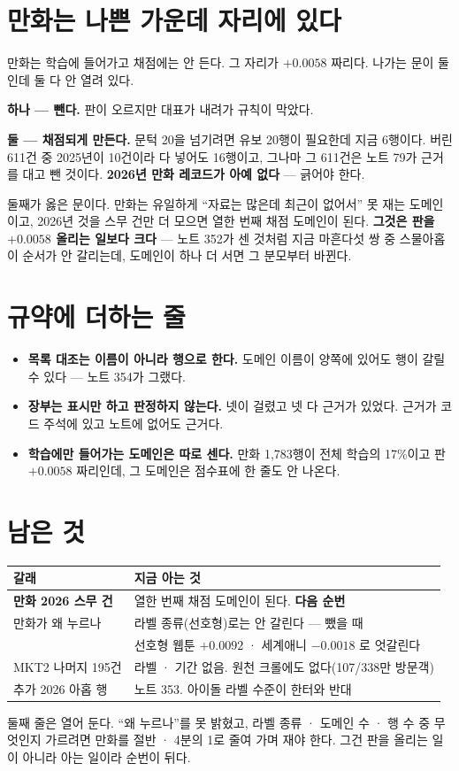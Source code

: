 \documentclass[11pt]{article}
\begin{document}
\section{만화는 나쁜 가운데 자리에 있다}

만화는 학습에 들어가고 채점에는 안 든다. 그 자리가 $+0.0058$ 짜리다.
나가는 문이 둘인데 둘 다 안 열려 있다.

\textbf{하나 --- 뺀다.} 판이 오르지만 대표가 내려가 규칙이 막았다.

\textbf{둘 --- 채점되게 만든다.} 문턱 20을 넘기려면 유보 20행이 필요한데
지금 6행이다. 버린 611건 중 2025년이 10건이라 다 넣어도 16행이고,
그나마 그 611건은 노트 79가 근거를 대고 뺀 것이다. \textbf{2026년 만화
레코드가 아예 없다} --- 긁어야 한다.

둘째가 옳은 문이다. 만화는 유일하게 ``자료는 많은데 최근이 없어서'' 못
재는 도메인이고, 2026년 것을 스무 건만 더 모으면 열한 번째 채점 도메인이
된다. \textbf{그것은 판을 $+0.0058$ 올리는 일보다 크다} --- 노트 352가
센 것처럼 지금 마흔다섯 쌍 중 스물아홉이 순서가 안 갈리는데, 도메인이
하나 더 서면 그 분모부터 바뀐다.

\section{규약에 더하는 줄}

\begin{itemize}
\item \textbf{목록 대조는 이름이 아니라 행으로 한다.} 도메인 이름이 양쪽에
있어도 행이 갈릴 수 있다 --- 노트 354가 그랬다.
\item \textbf{장부는 표시만 하고 판정하지 않는다.} 넷이 걸렸고 넷 다
근거가 있었다. 근거가 코드 주석에 있고 노트에 없어도 근거다.
\item \textbf{학습에만 들어가는 도메인은 따로 센다.} 만화 1,783행이
전체 학습의 17\%이고 판 $+0.0058$ 짜리인데, 그 도메인은 점수표에 한 줄도
안 나온다.
\end{itemize}

\section{남은 것}

\begin{center}
\begin{tabular}{ll}
\hline
갈래 & 지금 아는 것 \\
\hline
\textbf{만화 2026 스무 건} & 열한 번째 채점 도메인이 된다. \textbf{다음 순번} \\
만화가 왜 누르나 & 라벨 종류(선호형)로는 안 갈린다 --- 뺐을 때 \\
                & 선호형 웹툰 $+0.0092$ · 세계애니 $-0.0018$ 로 엇갈린다 \\
MKT2 나머지 195건 & 라벨 · 기간 없음. 원천 크롤에도 없다(107/338만 방문객) \\
추가 2026 아홉 행 & 노트 353. 아이돌 라벨 수준이 한터와 반대 \\
\hline
\end{tabular}
\end{center}

둘째 줄은 열어 둔다. ``왜 누르나''를 못 밝혔고, 라벨 종류 · 도메인 수 ·
행 수 중 무엇인지 가르려면 만화를 절반 · 4분의 1로 줄여 가며 재야 한다.
그건 판을 올리는 일이 아니라 아는 일이라 순번이 뒤다.
\end{document}
